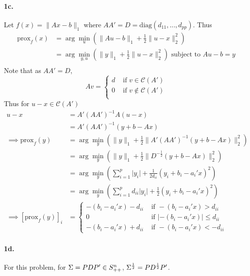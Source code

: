 \documentclass[12pt, leqno]{article}
\providecommand{\abs}[1]{\lvert#1\rvert}
\providecommand{\norm}[1]{\lVert#1\rVert}
\def\s{\ensuremath\Sigma}
\newcommand{\prox}{\mathrm{prox}}
\newcommand{\diag}{\mathrm{diag}}
\begin{document}
\paragraph{1c.} Let $f(x) = \norm{Ax-b}_1$ where $AA' = D = \diag(d_{11},...,d_{pp})$.
Thus 
\begin{align*}
\prox_{f} (x) &= \arg\min_{u} (\norm{Au-b}_{1} +
               \frac{1}{2}\norm{u-x}_2^2) \\
&= \arg\min_{y,u} (\norm{y}_{1} +
               \frac{1}{2}\norm{u-x}_2^2) \text { subject to } Au-b = y\\
\end{align*} 
Note that as $AA' = D$, 
\[
Av = \begin{cases} 
d & \text{ if } v \in \mathcal{C}(A')\\ 
0 & \text{ if } v \not\in \mathcal{C}(A')\\ 
\end{cases}
\]
Thus for $u-x \in \mathcal{C}(A')$ 
\begin{align*}
u-x &= A'(AA')^{-1}A(u-x) \\ 
&= A'(AA')^{-1}(y+b-Ax)\\
\implies \prox_{f} (y) &= \arg\min_{y}(\norm{y}_{1} +
                         \frac{1}{2}\norm{A'(AA')^{-1}(y+b-Ax)}_2^2)
  \\
&=\arg\min_{y}(\norm{y}_{1} +
                         \frac{1}{2}\norm{D^{-\frac{1}{2}}(y+b-Ax)}_2^2)
  \\
&= \arg\min_{y}(\sum_{i=1}^p \abs{y_i} + \frac{1}{2 {d_{ii}}}(y_i
  + b_i - a_i'x)^2) \\
&= \arg\min_{y}(\sum_{i=1}^p {d_{ii}} \abs{y_i} + \frac{1}{2}(y_i
  + b_i - a_i'x)^2) \\
\implies   [\prox_{f}(y)]_i 
  &= \begin{cases}  -(b_i - a_i'x) - {d_{ii}}&  \text{ if } -(b_i - a_i'x)>{d_{ii}} \\
0 & \text{ if } \abs{-(b_i - a_i'x)} \leq {d_{ii}} \\
 -(b_i - a_i'x) + {d_{ii}} & \text{ if }  -(b_i - a_i'x) < -{d_{ii}}
\end{cases}
\end{align*}

\paragraph{1d.} For this problem, for $\s = PDP' \in S_{++}^n$,
$\s ^{\frac{1}{2}} = PD^{\frac{1}{2}}P'$. 
\end{document}
